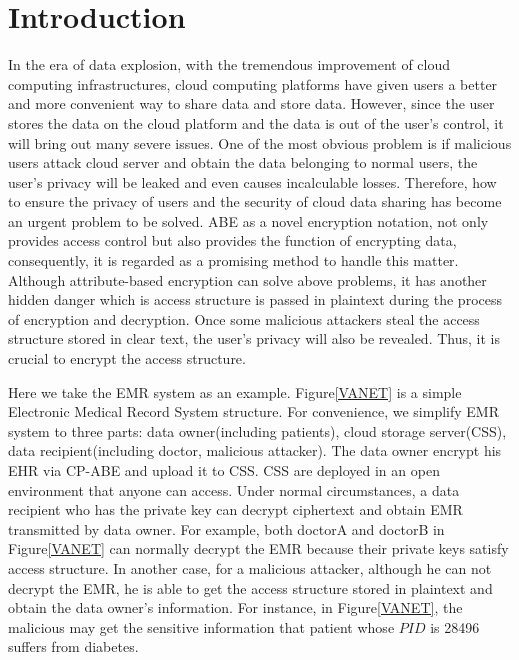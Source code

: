 \documentclass[smallextended]{svjour3}       %
\begin{document}
\section{Introduction}
	In the era of data explosion, with the tremendous improvement of cloud computing infrastructures, cloud computing platforms have given users a better and more convenient way to share data and store data.
	However, since the user stores the data on the cloud platform and the data is out of the user's control, it will bring out many severe issues.
	One of the most obvious problem is if malicious users attack cloud server and obtain the data belonging to normal users, the user's privacy will be leaked and even causes incalculable losses. 
	Therefore, how to ensure the privacy of users and the security of cloud data sharing has become an urgent problem to be solved. 
	ABE as a novel encryption notation, not only provides access control but also provides the function of encrypting data, consequently, it is regarded as a promising method to handle this matter. 
	Although attribute-based encryption can solve above problems, it has another hidden danger which is access structure is passed in plaintext during the process of encryption and decryption.
	Once some malicious attackers steal the access structure stored in clear text, the user's privacy will also be revealed. 
	Thus, it is crucial to encrypt the access structure.

	Here we take the EMR system as an example. 
	Figure\ref{VANET} is a simple Electronic Medical Record System structure. 
	For convenience, we simplify EMR system to three parts: data owner(including patients), cloud storage server(CSS), data recipient(including doctor, malicious attacker).
	The data owner encrypt his EHR via CP-ABE and upload it to CSS. 
	CSS are deployed in an open environment that anyone can access.
	Under normal circumstances, a data recipient who has the private key can decrypt ciphertext and obtain EMR transmitted by data owner.
	For example, both doctorA and doctorB in Figure\ref{VANET} can normally decrypt the EMR because their private keys satisfy access structure.
	In another case, for a malicious attacker, although he can not decrypt the EMR, he is able to get the access structure stored in plaintext and obtain the data owner's information.
	For instance, in Figure\ref{VANET}, the malicious may get the sensitive information that patient whose $PID$ is 28496 suffers from diabetes.  
\end{document}
